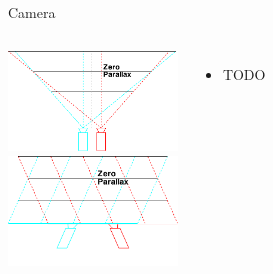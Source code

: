 \documentclass[12pt,ucs,hyperref={pdftext}]{beamer}
\newlength{\columnleft}
\newlength{\columnright}
\begin{document}
\begin{frame}{Camera}
\begin{columns}

\column{\columnleft}
\includegraphics[width=4.5cm]{media/camera-perspective.pdf}\\
\includegraphics[width=4.5cm]{media/camera-parallel.pdf}

\column{\columnright}
\begin{itemize}%
\item TODO
\end{itemize}

\end{columns}
\end{frame}
\end{document}
